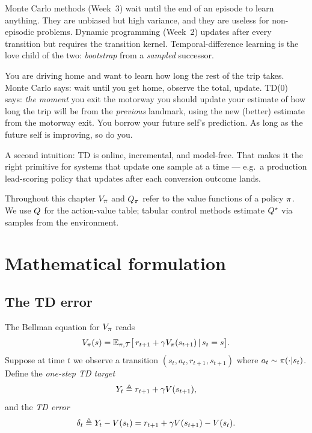 \documentclass[11pt,oneside]{scrbook}
\begin{document}
Monte Carlo methods (Week~3) wait until the end of an episode to learn anything. They are
unbiased but high variance, and they are useless for non-episodic problems. Dynamic
programming (Week~2) updates after every transition but requires the transition kernel.
Temporal-difference learning is the love child of the two: \emph{bootstrap} from a
\emph{sampled} successor.

\begin{intuition}
You are driving home and want to learn how long the rest of the trip takes. Monte Carlo
says: wait until you get home, observe the total, update. TD(0) says: \emph{the moment}
you exit the motorway you should update your estimate of how long the trip will be from
the \emph{previous} landmark, using the new (better) estimate from the motorway exit. You
borrow your future self's prediction. As long as the future self is improving, so do you.
\end{intuition}

A second intuition: TD is online, incremental, and model-free. That makes it the right
primitive for systems that update one sample at a time --- e.g.\ a production lead-scoring
policy that updates after each conversion outcome lands.

\begin{remark}
Throughout this chapter $V_\pi$ and $Q_\pi$ refer to the value functions of a
policy $\pi$. We use $Q$ for the action-value table; tabular control methods
estimate $Q^{\star}$ via samples from the environment.
\end{remark}

\chapter{Mathematical formulation}

\section{The TD error}

The Bellman equation for $V_\pi$ reads
\[
  V_\pi(s) = \mathbb{E}_{\pi,\mathcal{T}}\bigl[\,r_{t+1} + \gamma V_\pi(s_{t+1}) \,\vert\, s_t = s\bigr].
\]
Suppose at time $t$ we observe a transition $(s_t, a_t, r_{t+1}, s_{t+1})$ where
$a_t \sim \pi(\cdot|s_t)$. Define the \emph{one-step TD target}
\[
  Y_t \triangleq r_{t+1} + \gamma V(s_{t+1}),
\]
and the \emph{TD error}
\[
  \delta_t \triangleq Y_t - V(s_t) = r_{t+1} + \gamma V(s_{t+1}) - V(s_t).
\]
\end{document}
